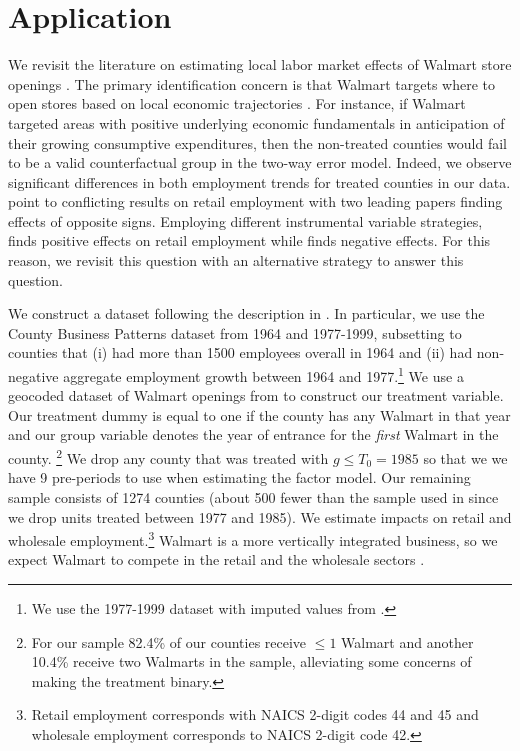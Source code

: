 \documentclass[12pt]{article}
\begin{document}
\section{Application}\label{sec:application}

We revisit the literature on estimating local labor market effects of Walmart store openings \citep{basker2005job, neumark2008effects, volpe2022economic}. The primary identification concern is that Walmart targets where to open stores based on local economic trajectories \citep{neumark2008effects}. For instance, if Walmart targeted areas with positive underlying economic fundamentals in anticipation of their growing consumptive expenditures, then the non-treated counties would fail to be a valid counterfactual group in the two-way error model. Indeed, we observe significant differences in both employment trends for treated counties in our data. \citet{volpe2022economic} point to conflicting results on retail employment with two leading papers finding effects of opposite signs. Employing different instrumental variable strategies, \citet{basker2005job} finds positive effects on retail employment while \citet{neumark2008effects} finds negative effects. For this reason, we revisit this question with an alternative strategy to answer this question. 

We construct a dataset following the description in \citet{basker2005job}. In particular, we use the County Business Patterns dataset from 1964 and 1977-1999, subsetting to counties that (i) had more than 1500 employees overall in 1964 and (ii) had non-negative aggregate employment growth between 1964 and 1977.\footnote{We use the 1977-1999 dataset with imputed values from \citet{eckert2021imputing}.} We use a geocoded dataset of Walmart openings from \citet{arcidiacono2020competitive} to construct our treatment variable. Our treatment dummy is equal to one if the county has any Walmart in that year and our group variable denotes the year of entrance for the \emph{first} Walmart in the county. \footnote{For our sample 82.4\% of our counties receive $\leq 1$ Walmart and another 10.4\% receive two Walmarts in the sample, alleviating some concerns of making the treatment binary.} We drop any county that was treated with $g \leq T_0 = 1985$ so that we we have 9 pre-periods to use when estimating the factor model. Our remaining sample consists of 1274 counties (about 500 fewer than the sample used in \citet{basker2005job} since we drop units treated between 1977 and 1985). We estimate impacts on retail and wholesale employment.\footnote{Retail employment corresponds with NAICS 2-digit codes 44 and 45 and wholesale employment corresponds to NAICS 2-digit code 42.} Walmart is a more vertically integrated business, so we expect Walmart to compete in the retail and the wholesale sectors \citep{basker2005job}.
\end{document}
